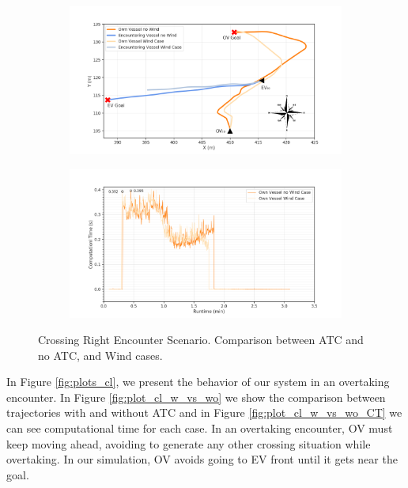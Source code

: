 \begin{figure}[H]
            \begin{subfigure}[b]{0.49\textwidth}
                \centering
                \includegraphics[width=\textwidth]{figs/Chap5/plot_cr_w_vs_wind.png}
                \caption{}
                \label{fig:plot_cr_w_vs_wind}
            \end{subfigure}
            \begin{subfigure}[b]{0.49\textwidth}
                \centering
                \includegraphics[width=\textwidth]{figs/Chap5/plot_cr_w_vs_wind_CT.png}
                \caption{}
                \label{fig:plot_cr_w_vs_wind_CT}
            \end{subfigure}
        
        \caption{Crossing Right Encounter Scenario. Comparison between \ac{ATC} and no \ac{ATC}, and Wind cases.}
        \label{fig:plots_cr}
        \end{figure}
        
        In Figure \ref{fig:plots_cl}, we present the behavior of our system in an overtaking encounter. In Figure \ref{fig:plot_cl_w_vs_wo} we show the comparison between trajectories with and without \ac{ATC} and in Figure \ref{fig:plot_cl_w_vs_wo_CT} we can see computational time for each case. In an overtaking encounter, \ac{OV} must keep moving ahead, avoiding to generate any other crossing situation while overtaking. In our simulation, \ac{OV} avoids going to \ac{EV} front until it gets near the goal.
        
